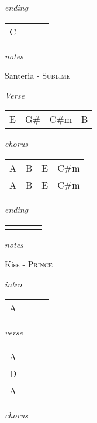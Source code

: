 \documentclass[12pt]{article}
\begin{document}
\textit{ending}

\begin{tabular}{|P{1.25in}|P{1.25in}|P{1.25in}|P{1.25in}|}
  C &   &   &   \\
\end{tabular}

\textit{notes}

\newpage

{\Huge Santeria} {\huge - \textsc{Sublime}}

\huge
\textit{Verse}

\begin{tabular}{|P{1.25in}|P{1.25in}|P{1.25in}|P{1.25in}|}
  E & G\#  & C\#m  & B  \\
\end{tabular}

\textit{chorus}

\begin{tabular}{|P{1.25in}|P{1.25in}|P{1.25in}|P{1.25in}|}
  A &  B & E  &  C\#m \\
  A &  B & E  &  C\#m \\
  
\end{tabular}

\textit{ending}

\begin{tabular}{|P{1.25in}|P{1.25in}|P{1.25in}|P{1.25in}|}
    &    &   &   \\
\end{tabular}

\textit{notes}

\newpage

{\Huge Kiss} {\huge - \textsc{Prince}}

\huge
\textit{intro}

\begin{tabular}{|P{1.25in}|P{1.25in}|P{1.25in}|P{1.25in}|}
  A &   &   &   \\
\end{tabular}

\textit{verse}

\begin{tabular}{|P{1.25in}|P{1.25in}|P{1.25in}|P{1.25in}|}
  A &   &   &   \\
  D &   &   &   \\
  A &   &   &   \\
\end{tabular}

\textit{chorus}
\end{document}
